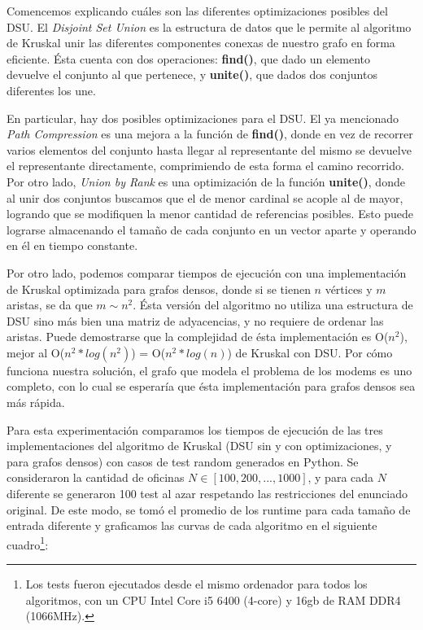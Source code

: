 \vspace{1em}
Comencemos explicando cuáles son las diferentes optimizaciones posibles del DSU. El \textit{Disjoint Set Union} es la estructura de datos que le permite al algoritmo de Kruskal unir las diferentes componentes conexas de nuestro grafo en forma eficiente. Ésta cuenta con dos operaciones: \textbf{find()}, que dado un elemento devuelve el conjunto al que pertenece, y \textbf{unite()}, que dados dos conjuntos diferentes los une. 

\vspace{1em}
En particular, hay dos posibles optimizaciones para el DSU. El ya mencionado \textit{Path Compression} es una mejora a la función de \textbf{find()}, donde en vez de recorrer varios elementos del conjunto hasta llegar al representante del mismo se devuelve el representante directamente, comprimiendo de esta forma el camino recorrido. Por otro lado, \textit{Union by Rank} es una optimización de la función \textbf{unite()}, donde al unir dos conjuntos buscamos que el de menor cardinal se acople al de mayor, logrando que se modifiquen la menor cantidad de referencias posibles. Esto puede lograrse almacenando el tamaño de cada conjunto en un vector aparte y operando en él en tiempo constante.

\vspace{1em}
Por otro lado, podemos comparar tiempos de ejecución con una implementación de Kruskal optimizada para grafos densos, donde si se tienen $n$ vértices y $m$ aristas, se da que $m \sim n^2$. Ésta versión del algoritmo no utiliza una estructura de DSU sino más bien una matriz de adyacencias, y no requiere de ordenar las aristas. Puede demostrarse que la complejidad de ésta implementación es O($n^2$), mejor al O($n^2 * log(n^2)$) = O($n^2 * log(n)$) de Kruskal con DSU. Por cómo funciona nuestra solución, el grafo que modela el problema de los modems es uno completo, con lo cual se esperaría que ésta implementación para grafos densos sea más rápida.

\vspace{1em}
Para esta experimentación comparamos los tiempos de ejecución de las tres implementaciones del algoritmo de Kruskal (DSU sin y con optimizaciones, y para grafos densos) con casos de test random generados en Python. Se consideraron la cantidad de oficinas $N \in [100, 200,..., 1000]$, y para cada $N$ diferente se generaron 100 test al azar respetando las restricciones del enunciado original. De este modo, se tomó el promedio de los runtime para cada tamaño de entrada diferente y graficamos las curvas de cada algoritmo en el siguiente cuadro\footnote{Los tests fueron ejecutados desde el mismo ordenador para todos los algoritmos, con un CPU Intel Core i5 6400 (4-core) y 16gb de RAM DDR4 (1066MHz).}:

